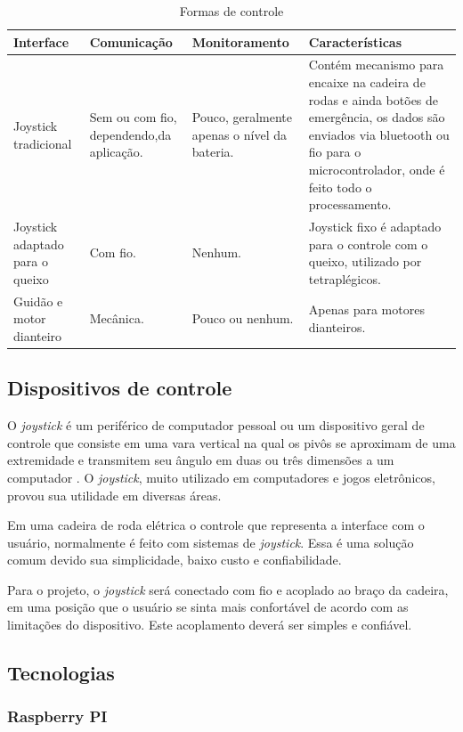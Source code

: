 \begin{table}[!ht]
	\centering
	\label{tab:formas_controle}
	\begin{tabular}{p{2.5cm}|p{3cm}|p{3cm}|p{5cm}}
		\hline
		Interface & Comunicação & Monitoramento & Características \\ \hline
		Joystick tradicional & Sem ou com fio, dependendo,da aplicação. & Pouco, geralmente apenas o nível da bateria. & Contém mecanismo para encaixe na cadeira de rodas e ainda botões de emergência, os dados são enviados via bluetooth ou fio para o microcontrolador, onde é feito todo o processamento. \\ \hline
		Joystick adaptado para o queixo & Com fio. & Nenhum. & Joystick fixo é adaptado para o controle com o queixo, utilizado por tetraplégicos. \\ \hline
		Guidão e motor dianteiro & Mecânica. & Pouco ou nenhum. & Apenas para motores dianteiros. \\ \hline
	\end{tabular}
	\caption{Formas de controle}
\end{table}

\subsection{Dispositivos de controle}

O \textit{joystick} é um periférico de computador pessoal ou um dispositivo geral de controle que consiste em uma vara vertical na qual os pivôs se aproximam de uma extremidade e transmitem seu ângulo em duas ou três dimensões a um computador \cite{livro_creating_games}. O \textit{joystick}, muito utilizado em computadores e jogos eletrônicos, provou sua utilidade em diversas áreas.

Em uma cadeira de roda elétrica o controle que representa a interface com o usuário, normalmente é feito com sistemas de \textit{joystick}. Essa é uma solução comum devido sua simplicidade, baixo custo e confiabilidade.

Para o projeto, o \textit{joystick} será conectado com fio e acoplado ao braço da cadeira, em uma posição que o usuário se sinta mais confortável de acordo com as limitações do dispositivo. Este acoplamento deverá ser simples e confiável.

\subsection{Tecnologias}
\label{subsec:tecnologias}
\subsubsection{Raspberry PI}

